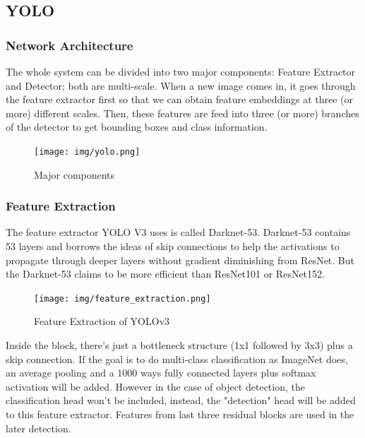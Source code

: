     \subsection{YOLO}
        \subsubsection{Network Architecture}
            The whole system can be divided into two major components: Feature Extractor and Detector; both are multi-scale. When a new image comes in, it goes through the feature extractor first so that we can obtain feature embeddings at three (or more) different scales. Then, these features are feed into three (or more) branches of the detector to get bounding boxes and class information.
            \begin{figure}[H]
                \centering
                \texttt{[image: img/yolo.png]}
                \caption{Major components}
            \end{figure}
        \subsubsection{Feature Extraction}
            The feature extractor YOLO V3 uses is called Darknet-53. Darknet-53 contains 53 layers and borrows the ideas of skip connections to help the activations to propagate through deeper layers without gradient diminishing from ResNet. But the Darknet-53 claims to be more efficient than ResNet101 or ResNet152.
            \begin{figure}[H]
                \centering
                \texttt{[image: img/feature\_extraction.png]}
                \caption{Feature Extraction of YOLOv3}
            \end{figure}
            \vspace{3mm}
            Inside the block, there’s just a bottleneck structure (1x1 followed by 3x3) plus a skip connection. If the goal is to do multi-class classification as ImageNet does, an average pooling and a 1000 ways fully connected layers plus softmax activation will be added. However in the case of object detection, the classification head won't be included, instead, the "detection" head will be added to this feature extractor. Features from last three residual blocks are used in the later detection. 
